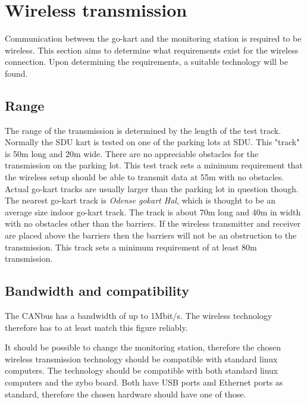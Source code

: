 
\section{Wireless transmission}\label{sec:wireless_analysis}
Communication between the go-kart and the monitoring station is required to be wireless.
This section aims to determine what requirements exist for the wireless connection. 
Upon determining the requirements, a suitable technology will be found.

\subsection{Range}
The range of the transmission is determined by the length of the test track. 
Normally the SDU kart is tested on one of the parking lots at SDU.
This "track" is 50\si{\metre} long and 20\si{\metre} wide.
There are no appreciable obstacles for the transmission on the parking lot. 
This test track sets a minimum requirement that the wireless setup should be able to transmit data at 55m with no obstacles.\\

Actual go-kart tracks are usually larger than the parking lot in question though. 
The nearest go-kart track is \textit{Odense gokart Hal}, which is thought to be an average size indoor go-kart track.
The track is about 70m long and 40m in width with no obstacles other than the barriers. 
If the wireless transmitter and receiver are placed above the barriers then the barriers will not be an obstruction to the transmission. 
This track sets a minimum requirement of at least 80m transmission.

\subsection{Bandwidth and compatibility}
The CANbus has a bandwidth of up to 1Mbit/s.
The wireless technology therefore has to at least match this figure reliably.

It should be possible to change the monitoring station, therefore the chosen wireless transmission technology should be compatible with standard linux computers.
The technology should be compatible with both standard linux computers and the zybo board.
Both have USB ports and Ethernet ports as standard, therefore the chosen hardware should have one of those.

